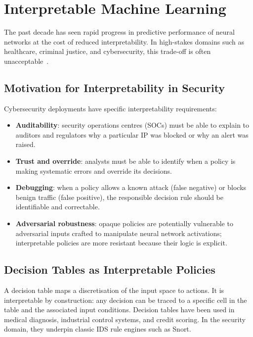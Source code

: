 \section{Interpretable Machine Learning}
\label{sec:bg_interpretable}

The past decade has seen rapid progress in predictive performance of neural
networks at the cost of reduced interpretability.
In high-stakes domains such as healthcare, criminal justice, and
cybersecurity, this trade-off is often unacceptable~\citep{rudin2019stop}.

\subsection{Motivation for Interpretability in Security}

Cybersecurity deployments have specific interpretability requirements:
%
\begin{itemize}
  \item \textbf{Auditability}: security operations centres (SOCs) must be
        able to explain to auditors and regulators why a particular IP was
        blocked or why an alert was raised.
  \item \textbf{Trust and override}: analysts must be able to identify when
        a policy is making systematic errors and override its decisions.
  \item \textbf{Debugging}: when a policy allows a known attack (false
        negative) or blocks benign traffic (false positive), the responsible
        decision rule should be identifiable and correctable.
  \item \textbf{Adversarial robustness}: opaque policies are potentially
        vulnerable to adversarial inputs crafted to manipulate neural network
        activations; interpretable policies are more resistant because their
        logic is explicit.
\end{itemize}

\subsection{Decision Tables as Interpretable Policies}

A decision table maps a discretisation of the input space to actions.
It is interpretable by construction: any decision can be traced to a
specific cell in the table and the associated input conditions.
Decision tables have been used in medical diagnosis, industrial control
systems, and credit scoring.
In the security domain, they underpin classic IDS rule engines such as Snort.

